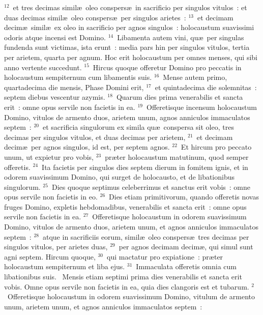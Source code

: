 ${}^{12}$~et tres decimas simil\ae\ oleo conspers\ae\ in sacrificio per singulos vitulos~: et duas decimas simil\ae\ oleo conspers\ae\ per singulos arietes~:
${}^{13}$~et decimam decim\ae\ simil\ae\ ex oleo in sacrificio per agnos singulos~: holocaustum suavissimi odoris atque incensi est Domino.
${}^{14}$~Libamenta autem vini, qu\ae\ per singulas fundenda sunt victimas, ista erunt~: media pars hin per singulos vitulos, tertia per arietem, quarta per agnum. Hoc erit holocaustum per omnes menses, qui sibi anno vertente succedunt.
${}^{15}$~Hircus quoque offeretur Domino pro peccatis in holocaustum sempiternum cum libamentis suis.
${}^{16}$~Mense autem primo, quartadecima die mensis, Phase Domini erit,
${}^{17}$~et quintadecima die solemnitas~: septem diebus vescentur azymis.
${}^{18}$~Quarum dies prima venerabilis et sancta erit~: omne opus servile non facietis in ea.
${}^{19}$~Offeretisque incensum holocaustum Domino, vitulos de armento duos, arietem unum, agnos anniculos immaculatos septem~:
${}^{20}$~et sacrificia singulorum ex simila qu\ae\ conspersa sit oleo, tres decimas per singulos vitulos, et duas decimas per arietem,
${}^{21}$~et decimam decim\ae\ per agnos singulos, id est, per septem agnos.
${}^{22}$~Et hircum pro peccato unum, ut expietur pro vobis,
${}^{23}$~pr\ae ter holocaustum matutinum, quod semper offeretis.
${}^{24}$~Ita facietis per singulos dies septem dierum in fomitem ignis, et in odorem suavissimum Domino, qui surget de holocausto, et de libationibus singulorum.
${}^{25}$~Dies quoque septimus celeberrimus et sanctus erit vobis~: omne opus servile non facietis in eo.
${}^{26}$~Dies etiam primitivorum, quando offeretis novas fruges Domino, expletis hebdomadibus, venerabilis et sancta erit~: omne opus servile non facietis in ea.
${}^{27}$~Offeretisque holocaustum in odorem suavissimum Domino, vitulos de armento duos, arietem unum, et agnos anniculos immaculatos septem~:
${}^{28}$~atque in sacrificiis eorum, simil\ae\ oleo conspers\ae\ tres decimas per singulos vitulos, per arietes duas,
${}^{29}$~per agnos decimam decim\ae , qui simul sunt agni septem. Hircum quoque,
${}^{30}$~qui mactatur pro expiatione~: pr\ae ter holocaustum sempiternum et liba ejus.
${}^{31}$~Immaculata offeretis omnia cum libationibus suis.
~\lettrine[lines=10,image=true,loversize=0.05,lraise=-0.03]{M}{}ensis etiam septimi prima dies venerabilis et sancta erit vobis. Omne opus servile non facietis in ea, quia dies clangoris est et tubarum.
${}^{2}$~Offeretisque holocaustum in odorem suavissimum Domino, vitulum de armento unum, arietem unum, et agnos anniculos immaculatos septem~:
